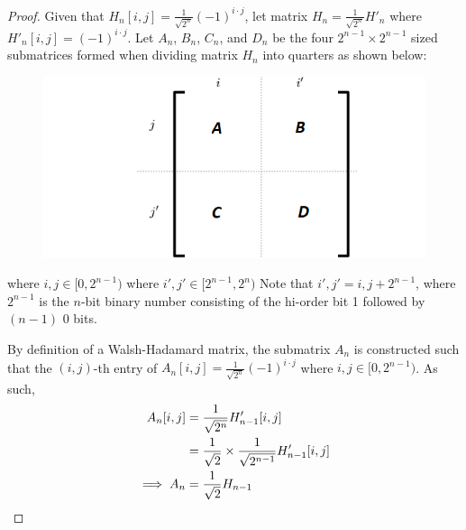 \documentclass[11pt]{article}
\theoremstyle{definition}
\theoremstyle{plain}
\theoremstyle{indented-remark}
\theoremstyle{indented-proof}
\begin{document}
\begin{proof}
Given that $H_{n}[i,j] = \frac{1}{\sqrt{2^{n}}}(-1)^{i \cdot j}$, let matrix $H_{n} = \frac{1}{\sqrt{2^{n}}} H'_{n}$ where $H'_{n}[i,j] = (-1)^{i \cdot j}$. \newline
\noindent Let $A_{n}$, $B_{n}$, $C_{n}$, and $D_{n}$ be the four $2^{n-1} \times 2^{n-1}$ sized submatrices formed when dividing matrix $H_{n}$ into quarters as shown below:

\begin{minipage}{0.4\textwidth}
\begin{figure}[H]
\includegraphics[scale=0.4]{images/MatrixQuadrants.png}
\end{figure}
\end{minipage} \hfill
\begin{minipage}{0.5\textwidth}
where $i,j \in [0, 2^{n-1})$ \newline
where $i',j' \in [2^{n-1}, 2^{n})$ \newline
\newline
Note that $i',j' = i,j + 2^{n-1}$, where\\
$2^{n-1}$ is the $n$-bit binary number consisting of the hi-order bit 1 followed by $(n-1)$ 0 bits.
\end{minipage} \newline

\noindent By definition of a Walsh-Hadamard matrix, the submatrix $A_{n}$ is constructed such that the $(i,j)$-th entry of 
$A_{n}[i,j] = \frac{1}{\sqrt{2^{n}}}(-1)^{i \cdot j}$ 
where $i,j \in [0, 2^{n-1})$. As such,
\begin{align}
A_{n}[i,j] &= \frac{1}{\sqrt{2^{n}}}H'_{n-1}[i,j]\notag \\
&= \frac{1}{\sqrt{2}} \times \frac{1}{\sqrt{2^{n-1}}}H'_{n-1}[i,j]\notag \\
\implies A_{n} &= \frac{1}{\sqrt{2}}H_{n-1}\notag
\end{align}


\end{proof}
\end{document}
